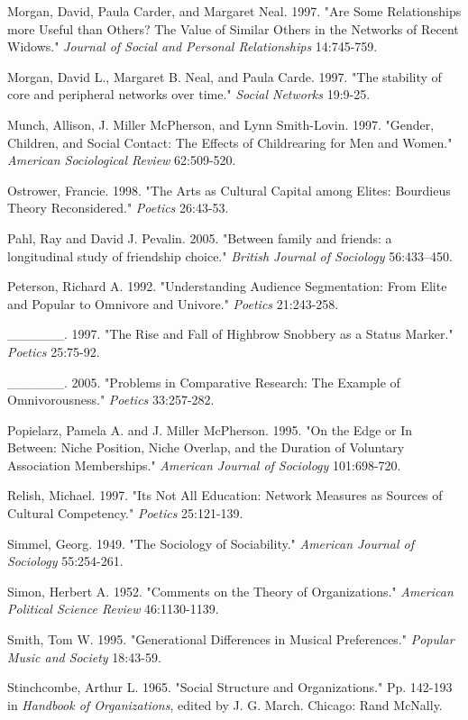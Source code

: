 Morgan, David, Paula Carder, and Margaret Neal. 1997. "Are Some Relationships more Useful than Others? The Value of Similar Others in the Networks of Recent Widows." \emph{Journal of Social and Personal Relationships} 14:745-759.

Morgan, David L., Margaret B. Neal, and Paula Carde. 1997. "The stability of core and peripheral networks over time." \emph{Social Networks} 19:9-25.

Munch, Allison, J. Miller McPherson, and Lynn Smith-Lovin. 1997. "Gender, Children, and Social Contact: The Effects of Childrearing for Men and Women." \emph{American Sociological Review} 62:509-520.

Ostrower, Francie. 1998. "The Arts as Cultural Capital among Elites: Bourdieu\textquotesingle s Theory Reconsidered." \emph{Poetics} 26:43-53.

Pahl, Ray and David J. Pevalin. 2005. "Between family and friends: a longitudinal study of friendship choice." \emph{British Journal of Sociology} 56:433--450.

Peterson, Richard A. 1992. "Understanding Audience Segmentation: From Elite and Popular to Omnivore and Univore." \emph{Poetics} 21:243-258.

\_\_\_\_\_\_. 1997. "The Rise and Fall of Highbrow Snobbery as a Status Marker." \emph{Poetics} 25:75-92.

\_\_\_\_\_\_. 2005. "Problems in Comparative Research: The Example of Omnivorousness." \emph{Poetics} 33:257-282.

Popielarz, Pamela A. and J. Miller McPherson. 1995. "On the Edge or In Between: Niche Position, Niche Overlap, and the Duration of Voluntary Association Memberships." \emph{American Journal of Sociology} 101:698-720.

Relish, Michael. 1997. "It\textquotesingle s Not All Education: Network Measures as Sources of Cultural Competency." \emph{Poetics} 25:121-139.

Simmel, Georg. 1949. "The Sociology of Sociability." \emph{American Journal of Sociology} 55:254-261.

Simon, Herbert A. 1952. "Comments on the Theory of Organizations." \emph{American Political Science Review} 46:1130-1139.

Smith, Tom W. 1995. "Generational Differences in Musical Preferences." \emph{Popular Music and Society} 18:43-59.

Stinchcombe, Arthur L. 1965. "Social Structure and Organizations." Pp. 142-193 in \emph{Handbook of Organizations}, edited by J. G. March. Chicago: Rand McNally.

